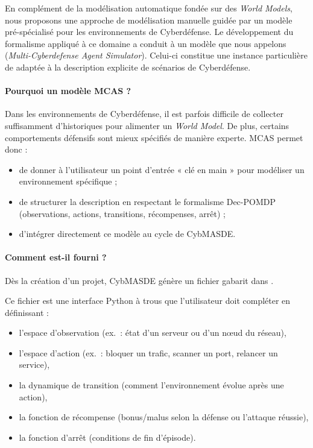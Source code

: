 En complément de la modélisation automatique fondée sur des \textit{World Models}, nous proposons une approche de modélisation manuelle guidée par un modèle pré-spécialisé pour les environnements de Cyberdéfense.
Le développement du formalisme  appliqué à ce domaine a conduit à un modèle que nous appelons  (\textit{Multi-Cyberdefense Agent Simulator}). Celui-ci constitue une instance particulière de  adaptée à la description explicite de scénarios de Cyberdéfense.

\paragraph{Pourquoi un modèle MCAS ?}
Dans les environnements de Cyberdéfense, il est parfois difficile de collecter suffisamment d’historiques pour alimenter un \textit{World Model}. De plus, certains comportements défensifs sont mieux spécifiés de manière experte. MCAS permet donc :
\begin{itemize}
  \item de donner à l’utilisateur un point d’entrée « clé en main » pour modéliser un environnement spécifique ;
  \item de structurer la description en respectant le formalisme Dec-POMDP (observations, actions, transitions, récompenses, arrêt) ;
  \item d’intégrer directement ce modèle au cycle de CybMASDE.
\end{itemize}

\paragraph{Comment est-il fourni ?}
Dès la création d’un projet, CybMASDE génère un fichier gabarit dans .

Ce fichier est une interface Python à trous que l’utilisateur doit compléter en définissant :
\begin{itemize}
  \item l’espace d’observation (ex.~: état d’un serveur ou d’un nœud du réseau),
  \item l’espace d’action (ex.~: bloquer un trafic, scanner un port, relancer un service),
  \item la dynamique de transition (comment l’environnement évolue après une action),
  \item la fonction de récompense (bonus/malus selon la défense ou l’attaque réussie),
  \item la fonction d’arrêt (conditions de fin d’épisode).
\end{itemize}

